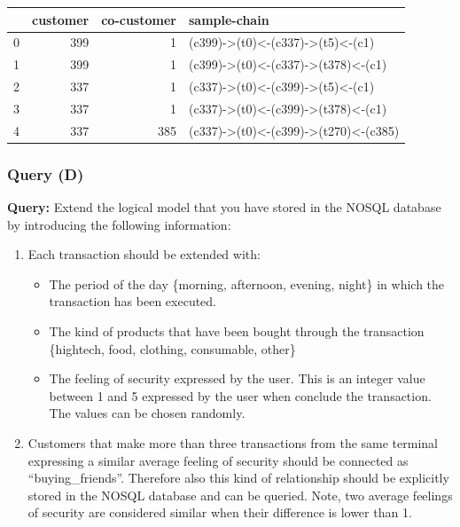             
    
    \begin{center}
\begin{tabular}{lrrl}
\toprule
 & customer & co-customer & sample-chain \\
\midrule
0 & 399 & 1 & (c399)->(t0)<-(c337)->(t5)<-(c1) \\
1 & 399 & 1 & (c399)->(t0)<-(c337)->(t378)<-(c1) \\
2 & 337 & 1 & (c337)->(t0)<-(c399)->(t5)<-(c1) \\
3 & 337 & 1 & (c337)->(t0)<-(c399)->(t378)<-(c1) \\
4 & 337 & 385 & (c337)->(t0)<-(c399)->(t270)<-(c385) \\
\bottomrule
\end{tabular}

\end{center}

    

    \hypertarget{query-d}{%
\subsubsection{Query (D)}\label{query-d}}

    \textbf{Query:} Extend the logical model that you have stored in the
NOSQL database by introducing the following information:

\begin{enumerate}
\def\labelenumi{\arabic{enumi}.}
\tightlist
\item
  Each transaction should be extended with:

  \begin{itemize}
  \tightlist
  \item
    The period of the day \{morning, afternoon, evening, night\} in
    which the transaction has been executed.
  \item
    The kind of products that have been bought through the transaction
    \{hightech, food, clothing, consumable, other\}
  \item
    The feeling of security expressed by the user. This is an integer
    value between 1 and 5 expressed by the user when conclude the
    transaction. The values can be chosen randomly.
  \end{itemize}
\item
  Customers that make more than three transactions from the same
  terminal expressing a similar average feeling of security should be
  connected as ``buying\_friends''. Therefore also this kind of
  relationship should be explicitly stored in the NOSQL database and can
  be queried. Note, two average feelings of security are considered
  similar when their difference is lower than 1.
\end{enumerate}

